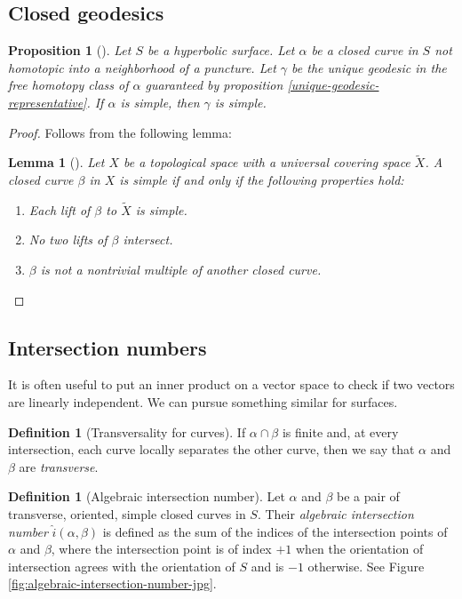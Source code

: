 \documentclass[reqno]{amsart}
\newtheorem{lemma}[theorem]{Lemma}
\newtheorem{proposition}[theorem]{Proposition}
\theoremstyle{definition}
\newtheorem{definition}[theorem]{Definition}
\theoremstyle{remark}
\begin{document}
\subsection{Closed geodesics}

\begin{proposition}[]
    Let $S$ be a hyperbolic surface. Let $\alpha$ be a closed curve
    in $S$ not homotopic into a neighborhood of a puncture. Let
    $\gamma$ be the unique geodesic in the free homotopy class of
    $\alpha$ guaranteed by proposition \ref{unique-geodesic-representative}.
    If $\alpha$ is simple, then $\gamma$ is simple.
\end{proposition}

\begin{proof}
    Follows from the following lemma:
    \begin{lemma}[]\label{simple-loop-lifts}
        Let $X$ be a topological space with a universal covering space
         $\tilde{X}$. A closed curve $\beta$ in $X$ is simple if and
        only if the following properties hold:
        \begin{enumerate}
            \item Each lift of $\beta$ to $\tilde{X}$ is simple.
            \item No two lifts of $\beta$ intersect.
            \item  $\beta$ is not a nontrivial multiple of another closed
                curve.
         \end{enumerate}
    \end{lemma}
\end{proof}

\subsection{Intersection numbers}

It is often useful to put an inner product on a vector space to check
if two vectors are linearly independent. We can pursue something similar for
surfaces.


\begin{definition}[Transversality for curves]
If $\alpha \cap \beta$ is finite and, at every intersection, each
curve locally separates the other curve, then we say that
$\alpha$ and $\beta$ are \textit{transverse}.
\end{definition}

\begin{definition}[Algebraic intersection number]
    Let $\alpha$ and $\beta$ be a pair of transverse, oriented,
    simple closed curves in $S$. Their \textit{algebraic intersection
    number} $\hat{i}\left( \alpha,\beta \right) $ is
    defined as the sum of the indices
    of the intersection points of $\alpha$ and $\beta$,
    where the intersection point is of index $+1$ when the
    orientation of intersection agrees with
    the orientation of $S$ and is $-1$ otherwise. See
    Figure \ref{fig:algebraic-intersection-number-jpg}.
\end{definition}
\end{document}
